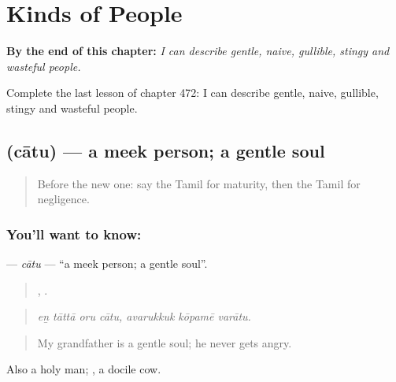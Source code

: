 
\chapter{Kinds of People}
\label{ch:ta-kinds-of-people}

\begin{chapteropening}
\textbf{By the end of this chapter:} \emph{I can describe gentle, naive, gullible, stingy and wasteful people.}

Complete the last lesson of chapter 472: I can describe gentle, naive, gullible, stingy and wasteful people.
\end{chapteropening}

\section[\texorpdfstring{\ta{சாது} (cātu)}{சாது (cātu)}]{ (cātu) — a meek person; a gentle soul}

\label{lesson:TA-C472-catu}



\begin{quote}
Before the new one: say the Tamil for maturity, then the Tamil for negligence.
\end{quote}

\subsection*{You'll want to know: }
\textbf{} — \emph{cātu} — \textquotedblleft{}a meek person; a gentle soul\textquotedblright{}.

\begin{quote}
   ,   .
\end{quote}

\begin{quote}
\emph{eṉ tāttā oru cātu, avarukkuk kōpamē varātu.}
\end{quote}

\begin{quote}
My grandfather is a gentle soul; he never gets angry.
\end{quote}

Also a holy man;  , a docile cow.

